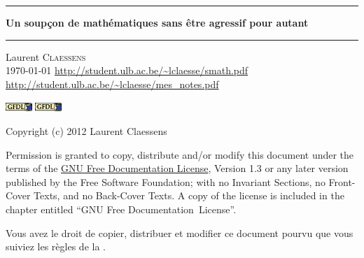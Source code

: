 
\thispagestyle{empty}
\begin{center}
  \begin{minipage}{15cm}
    \hrule\par
    \vspace{2mm}
    \begin{center}
    \Huge \bfseries Un soupçon de mathématiques sans être agressif pour autant \par
    \end{center}
    \hrule\par
  \end{minipage}
\end{center}

\vspace{2cm}

\begin{center}
    Laurent \textsc{Claessens}\\
    \today
    \url{http://student.ulb.ac.be/~lclaesse/smath.pdf}\\
    \url{http://student.ulb.ac.be/~lclaesse/mes_notes.pdf}
\end{center}

\vfill

\begin{center}

           \ifpdf
            \includegraphics[width=1cm]{gfdl-logo-small.png}
        \else
            \includegraphics[width=1cm]{gfdl-logo-small.eps}
        \fi

Copyright (c) 2012  Laurent Claessens

Permission is granted to copy, distribute and/or modify this document under the terms of the \href{http://www.gnu.org/licenses/fdl-1.3.html}{GNU Free Documentation License}, Version 1.3 or any later version published by the Free Software Foundation; with no Invariant Sections, no Front-Cover Texts, and no Back-Cover Texts. A copy of the license is included in the chapter entitled ``GNU Free Documentation~License''.

\vspace{0.5cm}

Vous avez le droit de copier, distribuer et modifier ce document pourvu que vous suiviez les règles de la .

\end{center}
